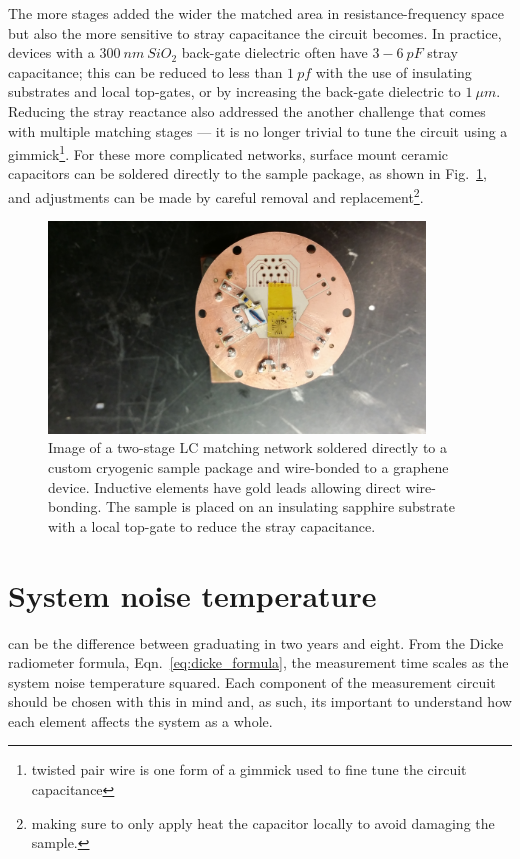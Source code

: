 The more stages added the wider the matched area in resistance-frequency space but also the more sensitive to stray capacitance the circuit becomes. In practice, devices with a $300~nm~SiO_2$ back-gate dielectric often have $3-6~pF$ stray capacitance; this can be reduced to less than $1~pf$ with the use of insulating substrates and local top-gates, or by increasing the back-gate dielectric to $1~\mu m$. Reducing the stray reactance also addressed the another challenge that comes with multiple matching stages --- it is no longer trivial to tune the circuit using a gimmick\footnote{twisted pair wire is one form of a gimmick used to fine tune the circuit capacitance}. For these more complicated networks, surface mount ceramic capacitors can be soldered directly to the sample package, as shown in Fig.~\ref{fig:picture_doubleLC}, and adjustments can be made by careful removal and replacement\footnote{making sure to only apply heat the capacitor locally to avoid damaging the sample.}.
\begin{figure}
\centering
\includegraphics[width = 100mm]{figures/Johnson_noise_thermometry/picture_matching_ceramic}
\caption{Image of a two-stage LC matching network soldered directly to a custom cryogenic sample package and wire-bonded to a graphene device. Inductive elements have gold leads allowing direct wire-bonding. The sample is placed on an insulating sapphire substrate with a local top-gate to reduce the stray capacitance.}
\label{fig:picture_doubleLC}
\end{figure}

\section{System noise temperature}
\label{section:system_noise_temperature}
 can be the difference between graduating in two years and eight. From the Dicke radiometer formula, Eqn.~\ref{eq:dicke_formula}, the measurement time scales as the system noise temperature squared. Each component of the measurement circuit should be chosen with this in mind and, as such, its important to understand how each element affects the system as a whole.

